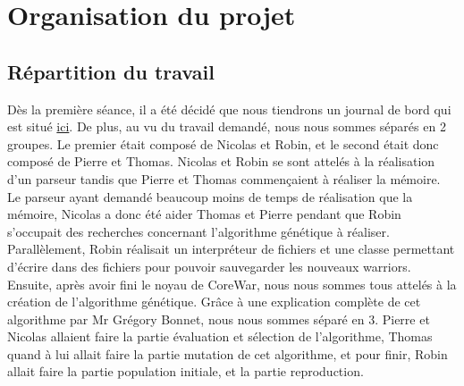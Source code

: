 \documentclass[a4paper,12pt]{article}
\begin{document}
\section{Organisation du projet}
\subsection{Répartition du travail}
Dès la première séance, il a été décidé que nous tiendrons un journal de bord qui est situé \href{https://forge.info.unicaen.fr/projects/core-war/wiki}{ici}. De plus, au vu du travail demandé, nous nous sommes séparés en 2 groupes. Le premier était composé de Nicolas et Robin, et le second était donc composé de Pierre et Thomas. Nicolas et Robin se sont attelés à la réalisation d'un parseur tandis que Pierre et Thomas commençaient à réaliser la mémoire. Le parseur ayant demandé beaucoup moins de temps de réalisation que la mémoire, Nicolas a donc été aider Thomas et Pierre pendant que Robin s'occupait des recherches concernant l'algorithme génétique à réaliser. Parallèlement, Robin réalisait un interpréteur de fichiers et une classe permettant d'écrire dans des fichiers pour pouvoir sauvegarder les nouveaux warriors. Ensuite, après avoir fini le noyau de CoreWar, nous nous sommes tous attelés à la création de l'algorithme génétique. Grâce à une explication complète de cet algorithme par Mr Grégory Bonnet, nous nous sommes séparé en 3. Pierre et Nicolas allaient faire la partie évaluation et sélection de l'algorithme, Thomas quand à lui allait faire la partie mutation de cet algorithme, et pour finir, Robin allait faire la partie population initiale, et la partie reproduction.
\end{document}
